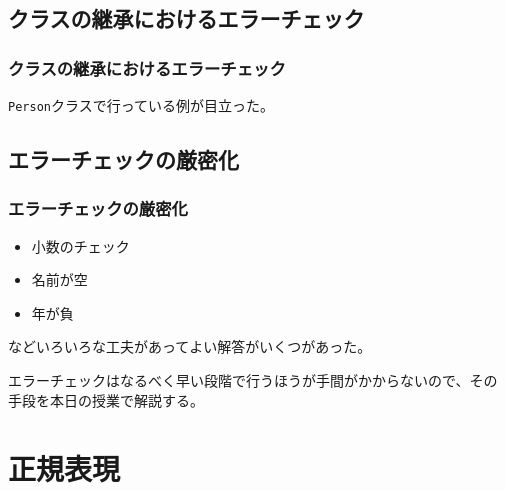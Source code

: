 	\subsection{クラスの継承におけるエラーチェック}
\begin{frame}
 \frametitle{クラスの継承におけるエラーチェック}
 \texttt{Person}クラスで行っている例が目立った。
\end{frame}
\subsection{エラーチェックの厳密化}
\begin{frame}
 \frametitle{エラーチェックの厳密化}
\begin{itemize}
 \item 小数のチェック
 \item 名前が空
 \item 年が負
\end{itemize}
 などいろいろな工夫があってよい解答がいくつがあった。

 エラーチェックはなるべく早い段階で行うほうが手間がかからないので、その
 手段を本日の授業で解説する。
\end{frame}
 \section{正規表現}
